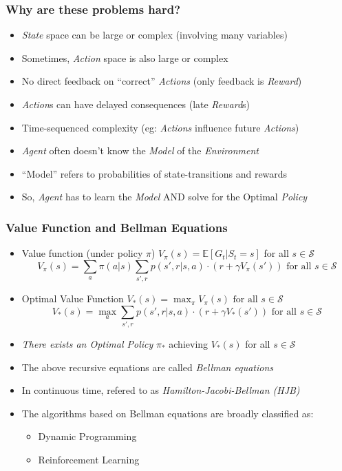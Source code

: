 \documentclass[handout]{beamer}
\begin{document}
\begin{frame}
\frametitle{Why are these problems hard?}
\pause
\begin{itemize}[<+->]
\item {\em State} space can be large or complex (involving many variables)
\item Sometimes, {\em Action} space is also large or complex
\item No direct feedback on ``correct'' {\em Actions} (only feedback is {\em Reward})
\item {\em Action}s can have delayed consequences (late {\em Reward}s)
\item Time-sequenced complexity (eg: {\em Actions} influence future {\em Actions})
\item {\em Agent} often doesn't know the {\em Model} of the {\em Environment}
\item ``Model'' refers to probabilities of state-transitions and rewards
\item So, {\em Agent} has to learn the {\em Model} AND solve for the Optimal {\em Policy}
\end{itemize}
\end{frame}

\begin{frame}
\frametitle{Value Function and Bellman Equations}
\pause
\begin{itemize}
\item Value function (under policy $\pi$) $V_{\pi}(s) = \mathbb{E}[G_t|S_t = s]$ for all $s \in \mathcal{S}$
\pause
$$V_{\pi}(s) = \sum_{a} \pi(a|s) \sum_{s',r} p(s',r|s,a) \cdot (r + \gamma V_{\pi}(s')) \mbox{ for all } s \in \mathcal{S}$$
\pause
\item Optimal Value Function $V_{*}(s) = \max_{\pi} V_{\pi}(s) \mbox{ for all } s \in \mathcal{S}$
\pause
$$V_{*}(s) = \max_{a} \sum_{s',r} p(s',r|s,a) \cdot (r + \gamma V_{*}(s')) \mbox{ for all } s \in \mathcal{S}$$
\pause
\item {\em There exists an Optimal Policy} $\pi_{*}$ achieving $V_{*}(s)$ for all $s \in \mathcal{S}$
\pause
\item The above recursive equations are called {\em Bellman equations}
\pause
\item In continuous time, refered to as {\em Hamilton-Jacobi-Bellman (HJB)}
\pause
\item The algorithms based on Bellman equations are broadly classified as:
\begin{itemize}
\item Dynamic Programming
\item Reinforcement Learning
\end{itemize}
\end{itemize}
\end{frame}
\end{document}
